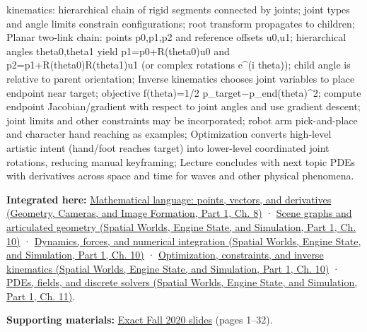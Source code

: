 kinematics: hierarchical chain of rigid segments connected by joints; joint types and angle limits constrain configurations; root transform propagates to children; Planar two-link chain: points p0,p1,p2 and reference offsets u0,u1; hierarchical angles theta0,theta1 yield p1=p0+R(theta0)u0 and p2=p1+R(theta0)R(theta1)u1 (or complex rotations e\^{}(i theta)); child angle is relative to parent orientation; Inverse kinematics chooses joint variables to place endpoint near target; objective f(theta)=1/2 \textbar\textbar p\_target−p\_end(theta)\textbar\textbar\^{}2; compute endpoint Jacobian/gradient with respect to joint angles and use gradient descent; joint limits and other constraints may be incorporated; robot arm pick-and-place and character hand reaching as examples; Optimization converts high-level artistic intent (hand/foot reaches target) into lower-level coordinated joint rotations, reducing manual keyframing; Lecture concludes with next topic PDEs with derivatives across space and time for waves and other physical phenomena.

\textbf{Integrated here:} \href{../03-Geometry-Cameras-and-Image-Formation-P01/main.pdf\#03-visual-computing-i-ch001-mathematical-language-points-vectors-and-derivatives}{Mathematical language: points, vectors, and derivatives (Geometry, Cameras, and Image Formation, Part 1, Ch. 8)} · \href{../05-Spatial-Worlds-Engine-State-and-Simulation-P01/main.pdf\#04-visual-computing-ii-ch029-scene-graphs-and-articulated-geometry}{Scene graphs and articulated geometry (Spatial Worlds, Engine State, and Simulation, Part 1, Ch. 10)} · \href{../05-Spatial-Worlds-Engine-State-and-Simulation-P01/main.pdf\#04-visual-computing-ii-ch029-dynamics-forces-and-numerical-integration}{Dynamics, forces, and numerical integration (Spatial Worlds, Engine State, and Simulation, Part 1, Ch. 10)} · \href{../05-Spatial-Worlds-Engine-State-and-Simulation-P01/main.pdf\#04-visual-computing-ii-ch029-optimization-constraints-and-inverse-kinematics}{Optimization, constraints, and inverse kinematics (Spatial Worlds, Engine State, and Simulation, Part 1, Ch. 10)} · \href{../05-Spatial-Worlds-Engine-State-and-Simulation-P01/main.pdf\#04-visual-computing-ii-ch030-pdes-fields-and-discrete-solvers}{PDEs, fields, and discrete solvers (Spatial Worlds, Engine State, and Simulation, Part 1, Ch. 11)}.

\textbf{Supporting materials:} \href{https://15462.courses.cs.cmu.edu/fall2020content/lectures/22_optimization/22_optimization_slides.pdf}{Exact Fall 2020 slides} (pages 1--32).

